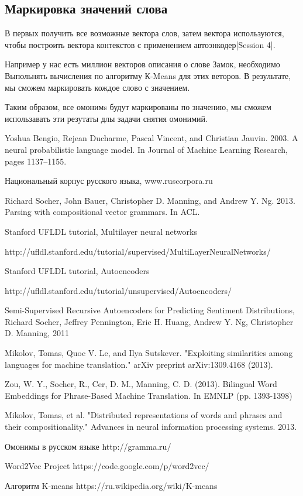 \documentclass[12pt]{article}
\begin{document}
	

\subsection{Маркировка значений слова}

В первых получить все возможные вектора слов, затем вектора используются, чтобы построить вектора контекстов с применением автоэнкодер[Session 4].

Например у нас есть миллион векторов описания о слове Замок, необходимо Выпольнять вычисления по алгоритму К-Means для этих веторов. В результате, мы сможем маркировать кождое слово с  значением.

Таким образом, все омонимs будут маркированы по значению, мы сможем использавать эти резутаты длы задачи снятия омонимий. 

\begin{thebibliography}{0}
Yoshua Bengio, Rejean Ducharme, Pascal Vincent, and Christian Jauvin. 2003. A neural probabilistic language model. In Journal of Machine Learning Research, pages 1137–1155.

Национальный корпус русского языка, www.ruscorpora.ru

Richard Socher, John Bauer, Christopher D. Manning, and Andrew Y. Ng. 2013. Parsing with compositional vector grammars. In ACL.

Stanford UFLDL tutorial, Multilayer neural networks 

http://ufldl.stanford.edu/tutorial/supervised/MultiLayerNeuralNetworks/

Stanford UFLDL tutorial, Autoencoders

http://ufldl.stanford.edu/tutorial/unsupervised/Autoencoders/

Semi-Supervised Recursive Autoencoders for Predicting Sentiment Distributions, Richard Socher, Jeffrey Pennington, Eric H. Huang, Andrew Y. Ng, Christopher D. Manning, 2011

Mikolov, Tomas, Quoc V. Le, and Ilya Sutskever. "Exploiting similarities among languages for machine translation." arXiv preprint arXiv:1309.4168 (2013).

Zou, W. Y., Socher, R., Cer, D. M., Manning, C. D. (2013). Bilingual Word Embeddings for Phrase-Based Machine Translation. In EMNLP (pp. 1393-1398)

Mikolov, Tomas, et al. "Distributed representations of words and phrases and their compositionality." Advances in neural information processing systems. 2013.

Омонимы в русском языке http://gramma.ru/

Word2Vec Project https://code.google.com/p/word2vec/

Алгоритм K-means https://ru.wikipedia.org/wiki/K-means

\end{thebibliography}
\end{document}
